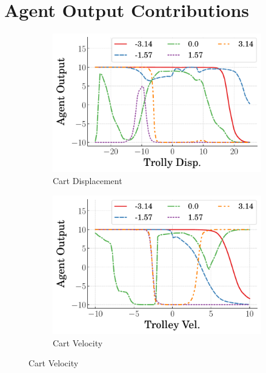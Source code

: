 \section{Agent Output Contributions}
%
\begin{figure}[tb]
    \centering
    \begin{subfigure}[b]{0.49\textwidth}
        \centering
        \includegraphics[width=\textwidth]{figures/figures_Interpretability/Invpend_contours/agent_contours_Trolly_Disp_trial_0.pdf}
        \caption{Cart Displacement}
        \label{subfig_chap5:agent_contribution_contours_trolley_disp}
    \end{subfigure}
    \hfill
    \begin{subfigure}[b]{0.49\textwidth}
        \centering
        \includegraphics[width=\textwidth]{figures/figures_Interpretability/Invpend_contours/agent_contours_Trolley_Vel_trial_0}
        \caption{Cart Velocity}

\end{subfigure}
\end{figure}

